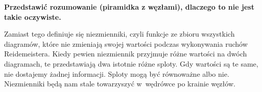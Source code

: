 {\color{red}\textbf{Przedstawić rozumowanie (piramidka z węzłami), dlaczego to nie jest takie oczywiste.}}

Zamiast tego definiuje się niezmienniki, czyli funkcje ze zbioru wszystkich diagramów, które nie zmieniają swojej wartości podczas wykonywania ruchów Reidemeistera.
Kiedy pewien niezmiennik przyjmuje różne wartości na dwóch diagramach, te przedstawiają dwa istotnie różne sploty.
Gdy wartości są te same, nie dostajemy żadnej informacji.
Sploty mogą być równoważne albo nie.
Niezmienniki będą nam stale towarzyszyć w~wędrówce po krainie węzłów.



